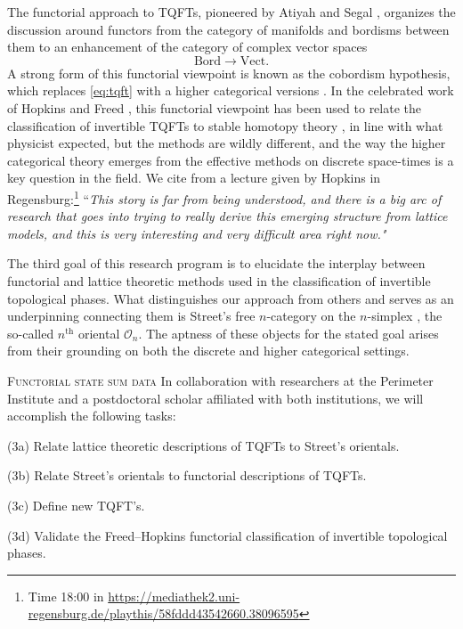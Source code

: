The functorial approach to TQFTs, pioneered by Atiyah and Segal \cite{atiyah1988tqft,segal1988conformal}, organizes the discussion around functors from the category of manifolds and bordisms between them to an enhancement of the category of complex vector spaces
\begin{equation}\label{eq:tqft}
	\mathrm{Bord} \to \mathrm{Vect}.
\end{equation}
A strong form of this functorial viewpoint is known as the cobordism hypothesis, which replaces \eqref{eq:tqft} with a higher categorical versions \cite{baez1995higher,lurie2008classification}.
In the celebrated work of Hopkins and Freed \cite{freed2021reflection}, this functorial viewpoint has been used to relate the classification of invertible TQFTs to stable homotopy theory \cite{freed2021reflection}, in line with what physicist expected, but the methods are wildly different, and the way the higher categorical theory emerges from the effective methods on discrete space-times is a key question in the field.
We cite from a lecture given by Hopkins in Regensburg:\footnote{Time 18:00 in \url{https://mediathek2.uni-regensburg.de/playthis/58fddd43542660.38096595}} ``\textit{This story is far from being understood, and there is a big arc of research that goes into trying to really derive this emerging structure from lattice models, and this is very interesting and very difficult area right now."}

The third goal of this research program is to elucidate the interplay between functorial and lattice theoretic methods used in the classification of invertible topological phases.
What distinguishes our approach from others and serves as an underpinning connecting them is Street's free $n$-category on the $n$-simplex \cite{street1987orientals}, the so-called $n^\text{th}$ oriental $\mathcal{O}_n$.
The aptness of these objects for the stated goal arises from their grounding on both the discrete and higher categorical settings.

\medskip\noindent\textsc{Functorial state sum data}
In collaboration with researchers at the Perimeter Institute and a postdoctoral scholar affiliated with both institutions, we will accomplish the following tasks:

\smallskip
\noindent(3a) Relate lattice theoretic descriptions of TQFTs to Street's orientals.\par
\noindent(3b) Relate Street's orientals to functorial descriptions of TQFTs.\par
\noindent(3c) Define new TQFT's.\par
\noindent(3d) Validate the Freed--Hopkins functorial classification of invertible topological phases.

